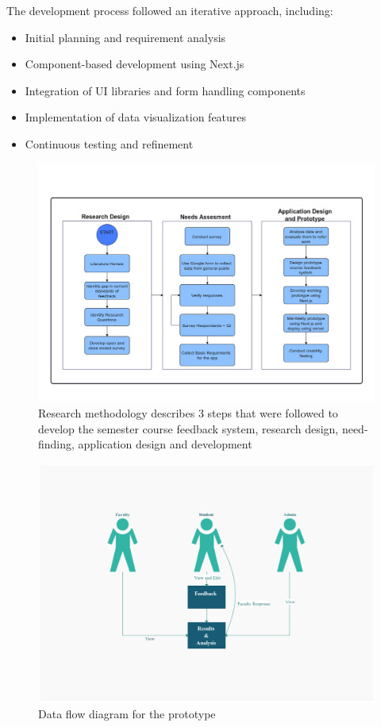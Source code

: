 \documentclass[conference]{IEEEtran}
\begin{document}
The development process followed an iterative approach, including:
\begin{itemize}
    \item Initial planning and requirement analysis
    \item Component-based development using Next.js
    \item Integration of UI libraries and form handling components
    \item Implementation of data visualization features
    \item Continuous testing and refinement
\end{itemize}

\begin{figure}[!htbp]
    \centering
    \includegraphics[width=0.8\linewidth]{research_workflow.png} 
    \caption{Research methodology describes 3 steps that were followed to develop the semester course feedback system, research design, need-finding,
    application design and development}
    \label{fig:research_workflow}
\end{figure}

\begin{figure}[!htbp]
    \centering
    \includegraphics[width=0.8\linewidth]{data_flow.png} 
    \caption{Data flow diagram for the prototype}
    \label{fig:data_workflow}
\end{figure}
\end{document}
